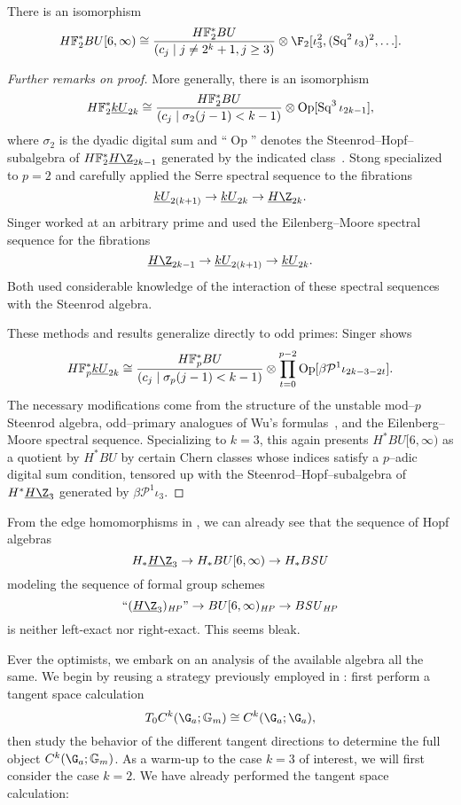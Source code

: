 \begin{theorem}\label{HF2BU6Calculation}
There is an isomorphism \[\HFtwo^* BU[6, \infty) \cong \frac{\HFtwo^* BU}{(c_j \mid j \ne 2^k + 1, j \ge 3)} \otimes \F_2[\iota_3^2, (\Sq^2 \iota_3)^2, \ldots].\]
\end{theorem}
\begin{proof}[Further remarks on proof]
More generally, there is an isomorphism \[\HFtwo^* \OS{kU}{2k} \cong \frac{\HFtwo^* BU}{(c_j \mid \sigma_2(j - 1) < k - 1)} \otimes \operatorname{Op}[\Sq^3 \iota_{2k-1}],\] where \(\sigma_2\) is the dyadic digital sum and ``\(\operatorname{Op}\)'' denotes the Steenrod--Hopf--subalgebra of \(\HFtwo^* \OS{H\Z}{2k-1}\) generated by the indicated class~\cite{Singer,Stong}.  Stong specialized to \(p = 2\) and carefully applied the Serre spectral sequence to the fibrations \[\OS{kU}{2(k+1)} \to \OS{kU}{2k} \to \OS{H\Z}{2k}.\]  Singer worked at an arbitrary prime and used the Eilenberg--Moore spectral sequence for the fibrations \[\OS{H\Z}{2k-1} \to \OS{kU}{2(k+1)} \to \OS{kU}{2k}.\]  Both used considerable knowledge of the interaction of these spectral sequences with the Steenrod algebra.

These methods and results generalize directly to odd primes: Singer shows \[\HFp^* \OS{kU}{2k} \cong \frac{\HFp^* BU}{(c_j \mid \sigma_p(j-1) < k-1)} \otimes \prod_{t=0}^{p-2} \operatorname{Op}[\beta \mathcal P^1 \iota_{2k-3-2t}].\]  The necessary modifications come from the structure of the unstable mod--\(p\) Steenrod algebra, odd--primary analogues of Wu's formulas~\cite{Shay}, and the Eilenberg--Moore spectral sequence.  Specializing to \(k = 3\), this again presents \(H^* BU[6, \infty)\) as a quotient by \(H^* BU\) by certain Chern classes whose indices satisfy a \(p\)--adic digital sum condition, tensored up with the Steenrod--Hopf--subalgebra of \(H^* \OS{H\Z}{3}\) generated by \(\beta \mathcal P^1 \iota_3\).
\end{proof}

From the edge homomorphisms in , we can already see that the sequence of Hopf algebras \[H_* \OS{H\Z}{3} \to H_* BU[6, \infty) \to H_* B\SU\] modeling the sequence of formal group schemes \[\text{``\((\OS{H\Z}{3})_{\mathit{HP}}\)''} \to BU[6, \infty)_{\mathit{HP}} \to B\SU_{\mathit{HP}}\] is neither left-exact nor right-exact.  This seems bleak.

Ever the optimists, we embark on an analysis of the available algebra all the same.  We begin by reusing a strategy previously employed in : first perform a tangent space calculation \[T_0 C^k(\G_a; \Gm) \cong C^k(\G_a; \G_a),\] then study the behavior of the different tangent directions to determine the full object \(C^k(\G_a; \Gm)\).  As a warm-up to the case \(k = 3\) of interest, we will first consider the case \(k = 2\).  We have already performed the tangent space calculation:


